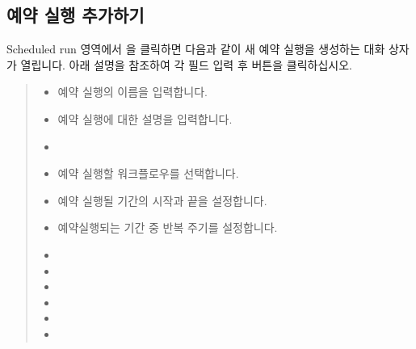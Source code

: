 \documentclass[letterpaper,10pt,english]{sphinxmanual}
\begin{document}
\subsection{예약 실행 추가하기}
\label{\detokenize{integrator/part03/scheduled_run:id3}}
Scheduled run 영역에서 을 클릭하면 다음과 같이 새 예약 실행을 생성하는 대화 상자가 열립니다. 아래 설명을 참조하여 각 필드 입력 후  버튼을 클릭하십시오.
\begin{quote}

\begin{figure}[H]
\centering

\noindent{}
\end{figure}
\begin{itemize}
\item {} 
 예약 실행의 이름을 입력합니다.

\item {} 
 예약 실행에 대한 설명을 입력합니다.

\item {} 

\item {} 
 예약 실행할 워크플로우를 선택합니다.

\item {} 
 예약 실행될 기간의 시작과 끝을 설정합니다.

\item {} 
 예약실행되는 기간 중 반복 주기를 설정합니다.

\item {} 

\item {} 

\item {} 

\item {} 

\item {} 

\item {} 

\end{itemize}
\end{quote}
\end{document}
